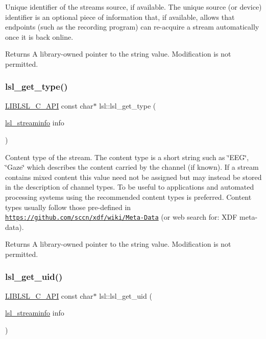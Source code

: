 Unique identifier of the stream\textquotesingle{}s source, if available. The unique source (or device) identifier is an optional piece of information that, if available, allows that endpoints (such as the recording program) can re-\/acquire a stream automatically once it is back online. \begin{DoxyReturn}{Returns}
A library-\/owned pointer to the string value. Modification is not permitted. 
\end{DoxyReturn}
\mbox{\label{namespacelsl_a417e01d26d64718513bc0ef2c58acf89}} 
\subsubsection{\texorpdfstring{lsl\+\_\+get\+\_\+type()}{lsl\_get\_type()}}
{\footnotesize\ttfamily \hyperlink{lsl__cpp_8h_aafd0ef1813e8be84a1420c4f1df64615}{L\+I\+B\+L\+S\+L\+\_\+\+C\+\_\+\+A\+PI} const char$\ast$ lsl\+::lsl\+\_\+get\+\_\+type (\begin{DoxyParamCaption}\item[{\hyperlink{namespacelsl_aa0a9ce9956061679949daa2e35aae2e8}{lsl\+\_\+streaminfo}}]{info }\end{DoxyParamCaption})}

Content type of the stream. The content type is a short string such as \char`\"{}\+E\+E\+G\char`\"{}, \char`\"{}\+Gaze\char`\"{} which describes the content carried by the channel (if known). If a stream contains mixed content this value need not be assigned but may instead be stored in the description of channel types. To be useful to applications and automated processing systems using the recommended content types is preferred. Content types usually follow those pre-\/defined in \href{https://github.com/sccn/xdf/wiki/Meta-Data}{\tt https\+://github.\+com/sccn/xdf/wiki/\+Meta-\/\+Data} (or web search for\+: X\+DF meta-\/data). \begin{DoxyReturn}{Returns}
A library-\/owned pointer to the string value. Modification is not permitted. 
\end{DoxyReturn}
\mbox{\label{namespacelsl_a6e18a9b1c544932e96179a44bb1f31ec}} 
\subsubsection{\texorpdfstring{lsl\+\_\+get\+\_\+uid()}{lsl\_get\_uid()}}
{\footnotesize\ttfamily \hyperlink{lsl__cpp_8h_aafd0ef1813e8be84a1420c4f1df64615}{L\+I\+B\+L\+S\+L\+\_\+\+C\+\_\+\+A\+PI} const char$\ast$ lsl\+::lsl\+\_\+get\+\_\+uid (\begin{DoxyParamCaption}\item[{\hyperlink{namespacelsl_aa0a9ce9956061679949daa2e35aae2e8}{lsl\+\_\+streaminfo}}]{info }\end{DoxyParamCaption})}

